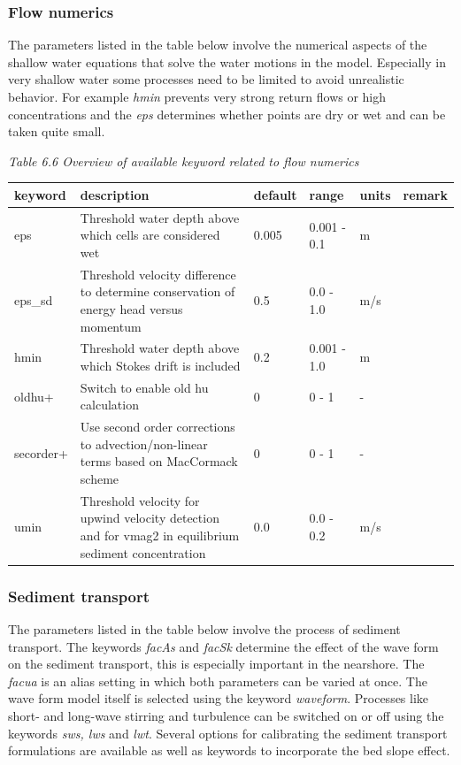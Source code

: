 \documentclass{article}
\begin{document}
\subsubsection{ Flow numerics}

\noindent The parameters listed in the table below involve the numerical aspects of the shallow water equations that solve the water motions in the model. Especially in very shallow water some processes need to be limited to avoid unrealistic behavior. For example \textit{hmin} prevents very strong return flows or high concentrations and the \textit{eps} determines whether points are dry or wet and can be taken quite small. 

\noindent \eject 

\noindent \textit{Table 6.6 Overview of available keyword related to flow numerics}

\begin{tabular}{|p{0.7in}|p{1.1in}|p{0.6in}|p{0.7in}|p{0.4in}|p{0.6in}|} \hline 
keyword & description & default & range & units & remark \\ \hline 
eps & Threshold water depth above which cells are considered wet & 0.005 & 0.001 - 0.1 & m &  \\ \hline 
eps\_sd & Threshold velocity difference to determine conservation of energy head versus momentum & 0.5 & 0.0 - 1.0 & m/s &  \\ \hline 
hmin & Threshold water depth above which Stokes drift is included & 0.2 & 0.001 - 1.0 & m &  \\ \hline 
oldhu+ & Switch to enable old hu calculation & 0 & 0 - 1 & - &  \\ \hline 
secorder+ & Use second order corrections to advection/non-linear terms based on MacCormack scheme & 0 & 0 - 1 & - &  \\ \hline 
umin & Threshold velocity for upwind velocity detection and for vmag2 in equilibrium sediment concentration & 0.0 & 0.0 - 0.2 & m/s &  \\ \hline 
\end{tabular}


\subsubsection{ Sediment transport}

\noindent The parameters listed in the table below involve the process of sediment transport. The keywords \textit{facAs }and \textit{facSk} determine the effect of the wave form on the sediment transport, this is especially important in the nearshore. The \textit{facua }is an alias setting in which both parameters can be varied at once. The wave form model itself is selected using the keyword \textit{waveform}. Processes like short- and long-wave stirring and turbulence can be switched on or off using the keywords \textit{sws, lws }and \textit{lwt}. Several options for calibrating the sediment transport formulations are available as well as keywords to incorporate the bed slope effect.
\end{document}
